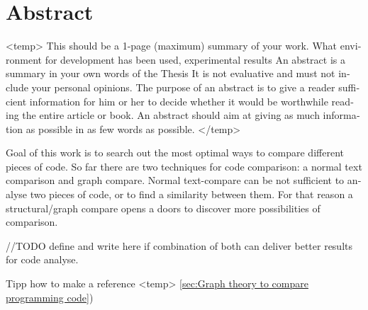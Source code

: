 \chapter{Abstract}

\begin{english} %

<temp>
This should be a 1-page (maximum) summary of your work. What environment for development has been used, experimental results 
An abstract is a summary in your own words of the Thesis It is not evaluative and must not include your personal opinions. The purpose of an abstract is to give a reader sufficient information for him or her to decide whether it would be worthwhile reading the entire article or book. An abstract should aim at giving as much information as possible in as few words as possible. 
</temp>

Goal of this work is to search out the most optimal ways to compare different pieces of code. So far there are two techniques for code comparison: a normal text comparison and graph compare. Normal text-compare can be not sufficient to analyse two pieces of code, or to find a similarity between them. For that reason a structural/graph compare opens a doors to discover more possibilities of comparison. 

//TODO define and write here if combination of both can deliver better results for code analyse.
\end{english}
Tipp how to make a reference <temp>
 \ref{sec:Graph theory to compare programming code})
